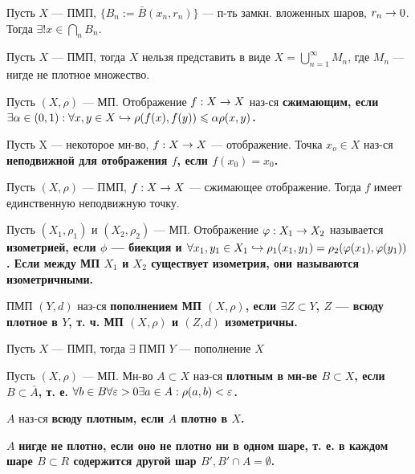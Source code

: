 \begin{thm}
Пусть $X$ --- ПМП, $\{B_n := \bar{B}(x_n, r_n)\}$ --- п-ть замкн. вложенных шаров, $r_n \rightarrow 0$. Тогда $\exists! x \in \bigcap\limits_n B_n$.
\end{thm}

\begin{thm}[2.2, Бэр]
Пусть $X$ --- ПМП, тогда $X$ нельзя представить в виде $X = \bigcup\limits_{n=1}^\infty M_n$, где $M_n$ --- нигде не плотное множество.
\end{thm}

\begin{defn}
Пусть $(X, \rho)$ --- МП. Отображение $f: X \rightarrow X$ наз-ся \bf{сжимающим}, если $\exists \alpha \in (0, 1): \forall x, y \in X \hookrightarrow \rho(f(x), f(y)) \leqslant \alpha \rho(x, y)$.
\end{defn}

\begin{defn}
Пусть X --- некоторое мн-во, $f: X \rightarrow X$ --- отображение. Точка $x_o \in X$ наз-ся \bf{неподвижной} для отображения $f$, если $f(x_0) = x_0$.
\end{defn}

\begin{thm}
Пусть $(X, \rho)$ --- ПМП, $f: X \rightarrow X$ --- сжимающее отображение. Тогда $f$ имеет единственную неподвижную точку.
\end{thm}

\begin{defn}
Пусть $(X_1, \rho_1)$ и $(X_2, \rho_2)$ --- МП. Отображение $\varphi: X_1 \rightarrow X_2$ называется \bf{изометрией}, если $\phi$ --- биекция и $\forall x_1, y_1 \in X_1 \hookrightarrow \rho_1(x_1, y_1) = \rho_2(\varphi(x_1), \varphi(y_1))$. Если между МП $X_1$ и $X_2$ существует изометрия, они называются \bf{изометричными}.
\end{defn}

\begin{defn}
ПМП $(Y, d)$ наз-ся \bf{пополнением} МП $(X, \rho)$, если $\exists Z \subset Y$, $Z$ --- всюду плотное в $Y$, т. ч. МП $(X, \rho)$ и $(Z, d)$ изометричны.
\end{defn}

\begin{thm}[2.4, Хаусдорф]
Пусть $X$ --- ПМП, тогда $\exists$ ПМП $Y$ --- пополнение $X$
\end{thm}

\begin{defn}
Пусть $(X, \rho)$ --- МП. Мн-во $A \subset X$ наз-ся \bf{плотным в мн-ве $B \subset X$}, если $B \subset \bar{A}$, т. е. $\forall b \in B \forall \varepsilon > 0 \exists a \in A: \rho(a, b) < \varepsilon$.

$A$ наз-ся \bf{всюду плотным}, если $A$ плотно в $X$.

$A$ \bf{нигде не плотно}, если оно не плотно ни в одном шаре, т. е. в каждом шаре $B \subset R$ содержится другой шар $B', B' \cap A = \emptyset$.
\end{defn}

